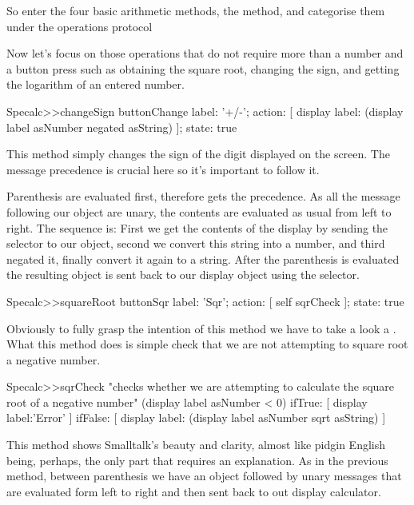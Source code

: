 \documentclass[a4paper,10pt,twoside]{book}
\begin{document}
So enter the four basic arithmetic methods, the  method, and categorise them under the operations protocol

Now let's focus on those operations that do not require more than a number and a button press such as obtaining the square root, changing the sign, and getting the logarithm of an entered number.


\begin{code}{}
Specalc>>changeSign
	buttonChange
		label: '+/-';
		action: [ display label: (display label asNumber negated asString) ];
		state: true
\end{code}

This method simply changes the sign of the digit displayed on the screen. The message precedence is crucial here so it's important to follow it. 

Parenthesis are evaluated first, therefore  gets the precedence. As all the message following our  object are unary, the contents are evaluated as usual from left to right.
The sequence is: First we get the contents of the display by sending the  selector to our  object, second we convert this string into a number, and third negated it, finally convert it again to a string.
After the parenthesis is evaluated the resulting object is sent back to our display object using the  selector.


\begin{code}{}
Specalc>>squareRoot
	buttonSqr
		label: 'Sqr';
		action: [ self sqrCheck ];
		state: true
\end{code}


Obviously to fully grasp the intention of this method we have to take a look a . What this method does is simple check that we are not attempting to square root a negative number.


\begin{code}{}
Specalc>>sqrCheck
	"checks whether we are attempting to calculate the square root of a negative number"
	(display label asNumber < 0)
		ifTrue:  [ display label:'Error' ]
		ifFalse: [ display label: (display label asNumber sqrt asString) ]
\end{code}


This method shows Smalltalk's beauty and clarity, almost like pidgin English being, perhaps,  the only part that requires an explanation. As in the previous method, between parenthesis we have an object followed by unary messages that are evaluated form left to right and then sent back to out display calculator.
\end{document}
